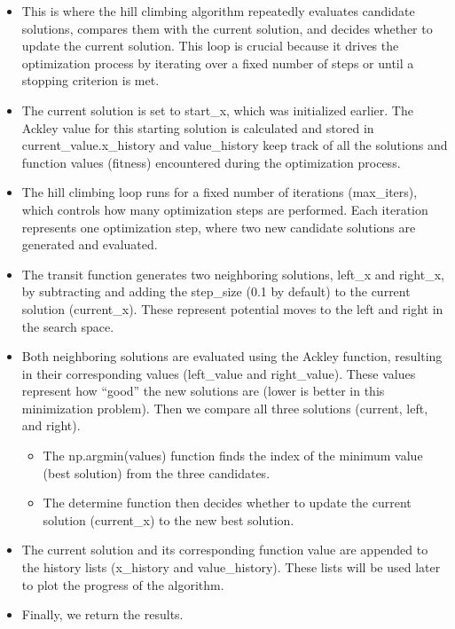 \documentclass[
  letterpaper,
  DIV=11,
  numbers=noendperiod]{scrreprt}
\providecommand{\tightlist}{%
  \setlength{\itemsep}{0pt}\setlength{\parskip}{0pt}}\usepackage{longtable,booktabs,array}
\begin{document}
\begin{itemize}
\tightlist
\item
  This is where the hill climbing algorithm repeatedly evaluates
  candidate solutions, compares them with the current solution, and
  decides whether to update the current solution. This loop is crucial
  because it drives the optimization process by iterating over a fixed
  number of steps or until a stopping criterion is met.
\item
  The current solution is set to start\_x, which was initialized
  earlier. The Ackley value for this starting solution is calculated and
  stored in current\_value.x\_history and value\_history keep track of
  all the solutions and function values (fitness) encountered during the
  optimization process.
\item
  The hill climbing loop runs for a fixed number of iterations
  (max\_iters), which controls how many optimization steps are
  performed. Each iteration represents one optimization step, where two
  new candidate solutions are generated and evaluated.
\item
  The transit function generates two neighboring solutions, left\_x and
  right\_x, by subtracting and adding the step\_size (0.1 by default) to
  the current solution (current\_x). These represent potential moves to
  the left and right in the search space.
\item
  Both neighboring solutions are evaluated using the Ackley function,
  resulting in their corresponding values (left\_value and
  right\_value). These values represent how ``good'' the new solutions
  are (lower is better in this minimization problem). Then we compare
  all three solutions (current, left, and right).

  \begin{itemize}
  \tightlist
  \item
    The np.argmin(values) function finds the index of the minimum value
    (best solution) from the three candidates.
  \item
    The determine function then decides whether to update the current
    solution (current\_x) to the new best solution.
  \end{itemize}
\item
  The current solution and its corresponding function value are appended
  to the history lists (x\_history and value\_history). These lists will
  be used later to plot the progress of the algorithm.
\item
  Finally, we return the results.
\end{itemize}
\end{document}
